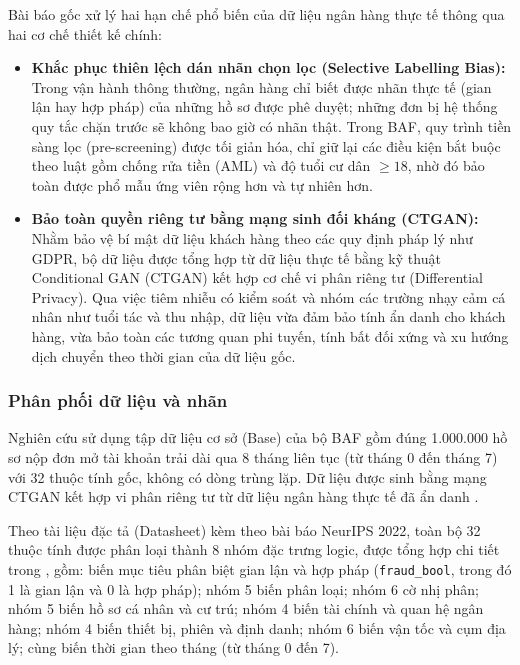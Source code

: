 Bài báo gốc xử lý hai hạn chế phổ biến của dữ liệu ngân hàng thực tế thông qua hai cơ chế thiết kế chính:
\begin{itemize}[leftmargin=*]
  \item \textbf{Khắc phục thiên lệch dán nhãn chọn lọc (Selective Labelling Bias):} Trong vận hành thông thường, ngân hàng chỉ biết được nhãn thực tế (gian lận hay hợp pháp) của những hồ sơ được phê duyệt; những đơn bị hệ thống quy tắc chặn trước sẽ không bao giờ có nhãn thật. Trong BAF, quy trình tiền sàng lọc (pre-screening) được tối giản hóa, chỉ giữ lại các điều kiện bắt buộc theo luật gồm chống rửa tiền (AML) và độ tuổi cư dân $\ge 18$, nhờ đó bảo toàn được phổ mẫu ứng viên rộng hơn và tự nhiên hơn.
  \item \textbf{Bảo toàn quyền riêng tư bằng mạng sinh đối kháng (CTGAN):} Nhằm bảo vệ bí mật dữ liệu khách hàng theo các quy định pháp lý như GDPR, bộ dữ liệu được tổng hợp từ dữ liệu thực tế bằng kỹ thuật Conditional GAN (CTGAN) kết hợp cơ chế vi phân riêng tư (Differential Privacy). Qua việc tiêm nhiễu có kiểm soát và nhóm các trường nhạy cảm cá nhân như tuổi tác và thu nhập, dữ liệu vừa đảm bảo tính ẩn danh cho khách hàng, vừa bảo toàn các tương quan phi tuyến, tính bất đối xứng và xu hướng dịch chuyển theo thời gian của dữ liệu gốc.
\end{itemize}

\subsubsection{Phân phối dữ liệu và nhãn}
Nghiên cứu sử dụng tập dữ liệu cơ sở (Base) của bộ BAF gồm đúng 1.000.000 hồ sơ nộp đơn mở tài khoản trải dài qua 8 tháng liên tục (từ tháng 0 đến tháng 7) với 32 thuộc tính gốc, không có dòng trùng lặp. Dữ liệu được sinh bằng mạng CTGAN kết hợp vi phân riêng tư từ dữ liệu ngân hàng thực tế đã ẩn danh \cite{jesus2022turning}.

Theo tài liệu đặc tả (Datasheet) kèm theo bài báo NeurIPS 2022, toàn bộ 32 thuộc tính được phân loại thành 8 nhóm đặc trưng logic, được tổng hợp chi tiết trong , gồm: biến mục tiêu phân biệt gian lận và hợp pháp (\texttt{fraud\_bool}, trong đó 1 là gian lận và 0 là hợp pháp); nhóm 5 biến phân loại; nhóm 6 cờ nhị phân; nhóm 5 biến hồ sơ cá nhân và cư trú; nhóm 4 biến tài chính và quan hệ ngân hàng; nhóm 4 biến thiết bị, phiên và định danh; nhóm 6 biến vận tốc và cụm địa lý; cùng biến thời gian theo tháng (từ tháng 0 đến 7).


